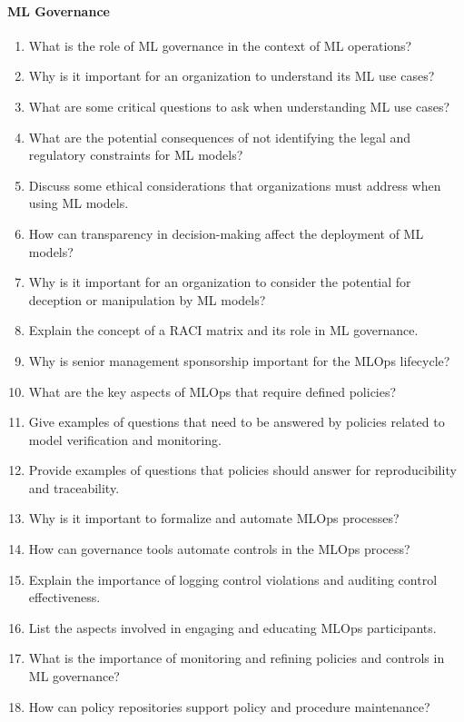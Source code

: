 \paragraph*{ML Governance}
\begin{enumerate}
    \item What is the role of ML governance in the context of ML operations?

    \item Why is it important for an organization to understand its ML use cases?
    \item What are some critical questions to ask when understanding ML use cases?
    \item What are the potential consequences of not identifying the legal and regulatory constraints for ML models?

    \item Discuss some ethical considerations that organizations must address when using ML models.
    \item How can transparency in decision-making affect the deployment of ML models?
    \item Why is it important for an organization to consider the potential for deception or manipulation by ML models?

    \item Explain the concept of a RACI matrix and its role in ML governance.
    \item Why is senior management sponsorship important for the MLOps lifecycle?

    \item What are the key aspects of MLOps that require defined policies?
    \item Give examples of questions that need to be answered by policies related to model verification and monitoring.
    \item Provide examples of questions that policies should answer for reproducibility and traceability.

    \item Why is it important to formalize and automate MLOps processes?
    \item How can governance tools automate controls in the MLOps process?
    \item Explain the importance of logging control violations and auditing control effectiveness.

    \item List the aspects involved in engaging and educating MLOps participants.

    \item What is the importance of monitoring and refining policies and controls in ML governance?
    \item How can policy repositories support policy and procedure maintenance?
\end{enumerate}

